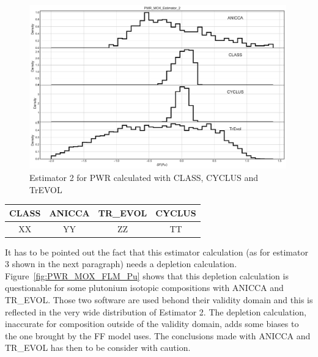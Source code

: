 \begin{figure}[h]
	\begin{center}
		\includegraphics[width = 0.99\textwidth]{../../Feature_1/RAW_DATA/FIG/PWR_MOX_Estimator_2.pdf}
		\caption{Estimator 2 for PWR calculated with CLASS, CYCLUS and TrEVOL}
		\label{fig:Est2_PWR}
	\end{center}
\end{figure}

\begin{table}[h]
	\begin{center}
		\begin{tabular}{|c||c||c||c|}
			\hline 
				CLASS & ANICCA & TR\_EVOL & CYCLUS \\
			\hline
				XX & YY & ZZ & TT \\
		\end{tabular}
	\end{center}
	\label{table:Est2_PWR}
\end{table}

It has to be pointed out the fact that this estimator calculation (as for estimator 3 shown in the next paragraph) needs a depletion calculation. Figure~\ref{fig:PWR_MOX_FLM_Pu} shows that this depletion calculation is questionable for some plutonium isotopic compositions with ANICCA and TR\_EVOL. Those two software are used behond their validity domain and this is reflected in the very wide distribution of Estimator 2. The depletion calculation, inaccurate for composition outside of the validity domain, adds some biases to the one brought by the FF model uses. The conclusions made with ANICCA and TR\_EVOL has then to be consider with caution.

